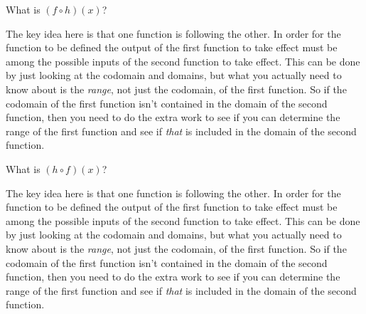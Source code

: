 \documentclass{ximera}
\begin{document}
\begin{problem}
    What is $(f\circ h)(x)$? 
    \begin{multipleChoice}
    \begin{feedback}
        The key idea here is that one function is following the other. In order for the function to be defined the output of the first function to take effect must be among the possible inputs of the second function to take effect. This can be done by just looking at the codomain and domains, but what you actually need to know about is the \textit{range}, not just the codomain, of the first function. So if the codomain of the first function isn't contained in the domain of the second function, then you need to do the extra work to see if you can determine the range of the first function and see if \textit{that} is included in the domain of the second function.
    \end{feedback}
    \end{multipleChoice}
\end{problem}

\begin{problem}
    What is $(h\circ f)(x)$? 
    \begin{multipleChoice}
    \end{multipleChoice}
    \begin{feedback}
        The key idea here is that one function is following the other. In order for the function to be defined the output of the first function to take effect must be among the possible inputs of the second function to take effect. This can be done by just looking at the codomain and domains, but what you actually need to know about is the \textit{range}, not just the codomain, of the first function. So if the codomain of the first function isn't contained in the domain of the second function, then you need to do the extra work to see if you can determine the range of the first function and see if \textit{that} is included in the domain of the second function.
    \end{feedback}
\end{problem}
\end{document}
